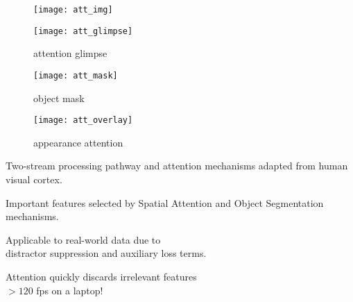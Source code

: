 
\vspace{1\baselineskip}


    \begin{minipage}[c]{0.3\textwidth}
        \centering
        \begin{subfigure}[b]{1.\textwidth}
            \texttt{[image: att\_img]}
        \end{subfigure}
        
        \hspace{-30pt}
        \begin{minipage}{.9\textwidth}
            \centering
            \vspace{.5em}
            \begin{subfigure}[b]{.31\textwidth}
                \centering
                \texttt{[image: att\_glimpse]}
                \caption*{\large attention glimpse}
            \end{subfigure}
            \hfill
            \begin{subfigure}[b]{.31\textwidth}
                \centering
                \texttt{[image: att\_mask]}
                \caption*{\large object mask}
            \end{subfigure}
            \hfill
            \begin{subfigure}[b]{.31\textwidth}
                \centering
                \texttt{[image: att\_overlay]}
                \caption*{\large appearance attention}
            \end{subfigure}
            
        \end{minipage}
    \end{minipage}\hfill
    \begin{minipage}[c]{0.3\textwidth}
        \vspace{1\baselineskip}
        \begin{description}[labelsep=1em, leftmargin=!,labelwidth=\widthof{\bfseries Interpretable:}, itemsep=0.5em]
            \item[Bio-inspired:] Two-stream processing pathway and attention mechanisms adapted from human visual cortex.
            \item[Interpretable:] Important features selected by Spatial Attention and Object Segmentation mechanisms.
            \item[Scalable:] Applicable to real-world data due to\\ distractor suppression and auxiliary loss terms.
            \item[Efficient:] Attention quickly discards irrelevant features\\
                              $> 120$ fps on a laptop! 
        \end{description}
    \end{minipage}

